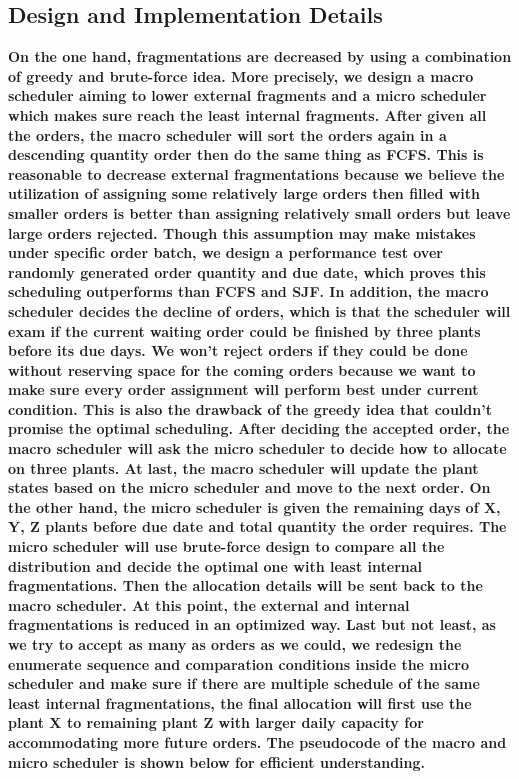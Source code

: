 \documentclass[conference]{IEEEtran}
\begin{document}
\subsection{\textbf{Design and Implementation Details}}
\textbf{On the one hand, fragmentations are decreased by using a combination of greedy and brute-force idea. More precisely, we design a macro scheduler aiming to lower external fragments and a micro scheduler which makes sure reach the least internal fragments. After given all the orders, the macro scheduler will sort the orders again in a descending quantity order then do the same thing as FCFS. This is reasonable to decrease external fragmentations because we believe the utilization of assigning some relatively large orders then filled with smaller orders is better than assigning relatively small orders but leave large orders rejected. Though this assumption may make mistakes under specific order batch, we design a performance test over randomly generated order quantity and due date, which proves this scheduling outperforms than FCFS and SJF. In addition, the macro scheduler decides the decline of orders, which is that the scheduler will exam if the current waiting order could be finished by three plants before its due days. We won’t reject orders if they could be done without reserving space for the coming orders because we want to make sure every order assignment will perform best under current condition. This is also the drawback of the greedy idea that couldn’t promise the optimal scheduling. After deciding the accepted order, the macro scheduler will ask the micro scheduler to decide how to allocate on three plants. At last, the macro scheduler will update the plant states based on the micro scheduler and move to the next order.
On the other hand, the micro scheduler is given the remaining days of X, Y, Z plants before due date and total quantity the order requires. The micro scheduler will use brute-force design to compare all the distribution and decide the optimal one with least internal fragmentations. Then the allocation details will be sent back to the macro scheduler. At this point, the external and internal fragmentations is reduced in an optimized way.
Last but not least, as we try to accept as many as orders as we could, we redesign the enumerate sequence and comparation conditions inside the micro scheduler and make sure if there are multiple schedule of the same least internal fragmentations, the final allocation will first use the plant X to remaining plant Z with larger daily capacity for accommodating more future orders. The pseudocode of the macro and micro scheduler is shown below for efficient understanding.}
\end{document}
